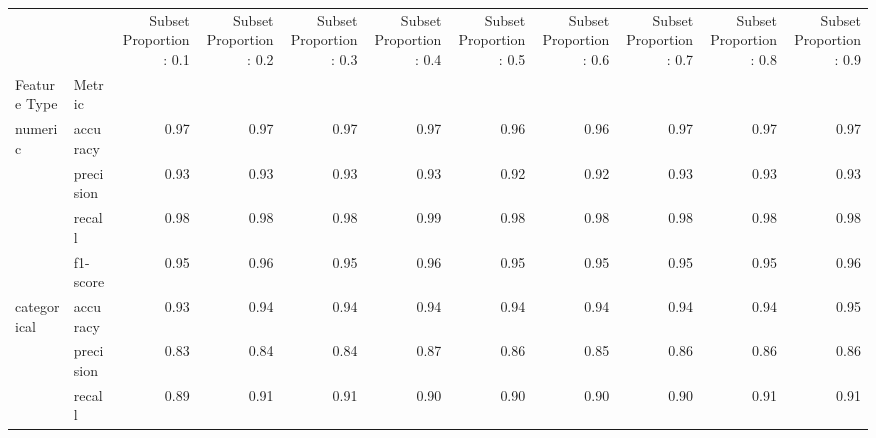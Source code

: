 \begin{tabular}{llrrrrrrrrr}
\toprule
                 &          &  Subset Proportion: 0.1 &  Subset Proportion: 0.2 &  Subset Proportion: 0.3 &  Subset Proportion: 0.4 &  Subset Proportion: 0.5 &  Subset Proportion: 0.6 &  Subset Proportion: 0.7 &  Subset Proportion: 0.8 &  Subset Proportion: 0.9 \\
Feature Type & Metric &                         &                         &                         &                         &                         &                         &                         &                         &                         \\
\midrule
numeric & accuracy &                    0.97 &                    0.97 &                    0.97 &                    0.97 &                    0.96 &                    0.96 &                    0.97 &                    0.97 &                    0.97 \\
                 & precision &                    0.93 &                    0.93 &                    0.93 &                    0.93 &                    0.92 &                    0.92 &                    0.93 &                    0.93 &                    0.93 \\
                 & recall &                    0.98 &                    0.98 &                    0.98 &                    0.99 &                    0.98 &                    0.98 &                    0.98 &                    0.98 &                    0.98 \\
                 & f1-score &                    0.95 &                    0.96 &                    0.95 &                    0.96 &                    0.95 &                    0.95 &                    0.95 &                    0.95 &                    0.96 \\
categorical & accuracy &                    0.93 &                    0.94 &                    0.94 &                    0.94 &                    0.94 &                    0.94 &                    0.94 &                    0.94 &                    0.95 \\
                 & precision &                    0.83 &                    0.84 &                    0.84 &                    0.87 &                    0.86 &                    0.85 &                    0.86 &                    0.86 &                    0.86 \\
                 & recall &                    0.89 &                    0.91 &                    0.91 &                    0.90 &                    0.90 &                    0.90 &                    0.90 &                    0.91 &                    0.91 \\

\end{tabular}

